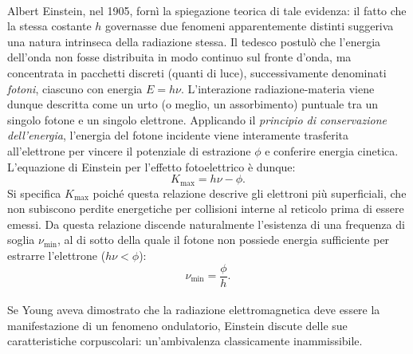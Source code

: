 \documentclass[a4paper,11pt]{report}
\begin{document}
\\
Albert Einstein, nel 1905, fornì la spiegazione teorica di tale evidenza: il fatto che la stessa costante $h$ governasse due fenomeni apparentemente distinti suggeriva una natura intrinseca della radiazione stessa.
Il tedesco postulò che l'energia dell'onda non fosse distribuita in modo continuo sul fronte d'onda, ma concentrata in pacchetti discreti (quanti di luce), successivamente denominati \textit{fotoni}, ciascuno con energia $E = h\nu$.
L'interazione radiazione-materia viene dunque descritta come un urto (o meglio, un assorbimento) puntuale tra un singolo fotone e un singolo elettrone. Applicando il \textit{principio di conservazione dell'energia}, l'energia del fotone incidente viene interamente trasferita all'elettrone per vincere il potenziale di estrazione $\phi$ e conferire energia cinetica.
L'equazione di Einstein per l'effetto fotoelettrico è dunque:
\begin{equation}
K_{\max} = h\nu - \phi.
\end{equation}
Si specifica $K_{\max}$ poiché questa relazione descrive gli elettroni più superficiali, che non subiscono perdite energetiche per collisioni interne al reticolo prima di essere emessi.
Da questa relazione discende naturalmente l'esistenza di una frequenza di soglia $\nu_{\text{min}}$, al di sotto della quale il fotone non possiede energia sufficiente per estrarre l'elettrone ($h\nu < \phi$):
\begin{equation}
\nu_{\text{min}} = \frac{\phi}{h}.
\end{equation}
\\
Se Young aveva dimostrato che la radiazione elettromagnetica deve essere la manifestazione di un fenomeno ondulatorio, Einstein discute delle sue caratteristiche corpuscolari: un'ambivalenza classicamente inammissibile.
\end{document}
